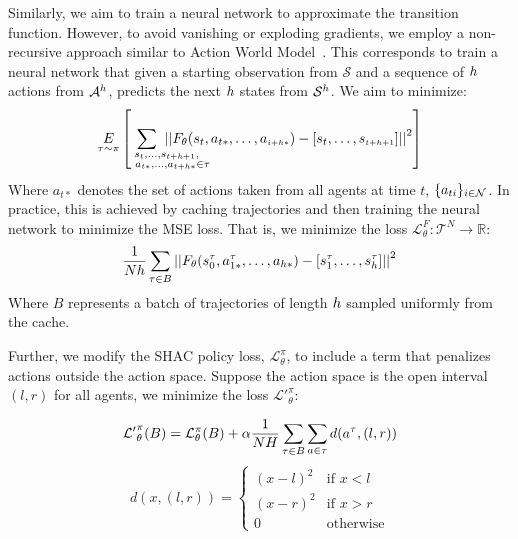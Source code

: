 Similarly, we aim to train a neural network to approximate the transition function. However, to avoid vanishing or exploding gradients, we employ a non-recursive approach similar to Action World Model~\cite{Ma24}. This corresponds to train a neural network that given a starting observation from $\mathcal{S}$ and a sequence of $h$ actions from $\mathcal{A}^h$, predicts the next $h$ states from $\mathcal{S}^h$. We aim to minimize:
\begin{align*}
    \underset{\tau\sim\pi}{E}\left[\hspace{-1.2cm}\sum_{\scriptscriptstyle \hspace{1cm}\substack{s_t,\dots,s_{t+h+1},\\\hspace{.3cm}a_{t*},\dots,a_{t+h*}\in\tau}}\hspace{-1.2cm} \left\vert\left\vert \transition_{\theta}(s_t, a_{t*},\dots,a_{\scriptscriptstyle i+h*}) - [s_t,\dots,s_{\scriptscriptstyle t+h+1}] \right\vert\right\vert^2\right] 
\end{align*}
Where $a_{t*}$ denotes the set of actions taken from all agents at time $t$, $\{a_{ti}\}_{i\in\mathcal{N}}$. In practice, this is achieved by caching trajectories and then training the neural network to minimize the MSE loss. That is, we minimize the loss $\mathcal{L}_\theta^{F}:\mathcal{T}^N\rightarrow\mathbb{R}$:
$$ \frac{1}{Nh}\sum_{\tau \in B}\left|\left| F_{\theta}(s_0^\tau, a_{1*}^\tau, \dots, a_{h*}) - \left[ s^\tau_1, \dots, s^\tau_h \right] \right|\right|^2 $$
Where $B$ represents a batch of trajectories of length $h$ sampled uniformly from the cache.

Further, we modify the SHAC policy loss, $\mathcal{L}_\theta^{\pi}$, to include a term that penalizes actions outside the action space. Suppose the action space is the open interval $(l,r)$ for all agents, we minimize the loss $\mathcal{L'}_\theta^\pi:$

$$\mathcal{L'}_\theta^\pi(B) = \mathcal{L}_\theta^\pi(B) + \alpha \frac{1}{NH}\sum_{\tau\in B}\sum_{a\in\tau} d(a^\tau,(l,r))$$
$$d(x,(l,r)) = \begin{cases}(x-l)^2 & \text{if } x < l \\ (x-r)^2 & \text{if } x > r \\ 0 & \text{otherwise} \end{cases}$$

